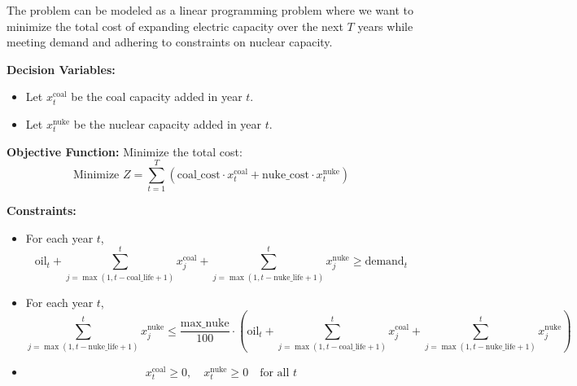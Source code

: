 \documentclass{article}
\begin{document}
The problem can be modeled as a linear programming problem where we want to minimize the total cost of expanding electric capacity over the next \( T \) years while meeting demand and adhering to constraints on nuclear capacity.

\textbf{Decision Variables:}
\begin{itemize}
    \item Let \( x_t^{\text{coal}} \) be the coal capacity added in year \( t \).
    \item Let \( x_t^{\text{nuke}} \) be the nuclear capacity added in year \( t \).
\end{itemize}

\textbf{Objective Function:}
Minimize the total cost:
\[ 
\text{Minimize } Z = \sum_{t=1}^{T} \left( \text{coal\_cost} \cdot x_t^{\text{coal}} + \text{nuke\_cost} \cdot x_t^{\text{nuke}} \right)
\]

\textbf{Constraints:}
\begin{itemize}
    \item {} For each year \( t \),
    \[
    \text{oil}_t + \sum_{j=\max(1, t-\text{coal\_life}+1)}^{t} x_j^{\text{coal}} + \sum_{j=\max(1, t-\text{nuke\_life}+1)}^{t} x_j^{\text{nuke}} \geq \text{demand}_t
    \]

    \item {} For each year \( t \),
    \[
    \sum_{j=\max(1, t-\text{nuke\_life}+1)}^{t} x_j^{\text{nuke}} \leq \frac{\text{max\_nuke}}{100} \cdot \left( \text{oil}_t + \sum_{j=\max(1, t-\text{coal\_life}+1)}^{t} x_j^{\text{coal}} + \sum_{j=\max(1, t-\text{nuke\_life}+1)}^{t} x_j^{\text{nuke}} \right)
    \]

    \item {}
    \[
    x_t^{\text{coal}} \geq 0, \quad x_t^{\text{nuke}} \geq 0 \quad \text{for all } t
    \]
\end{itemize}
\end{document}
